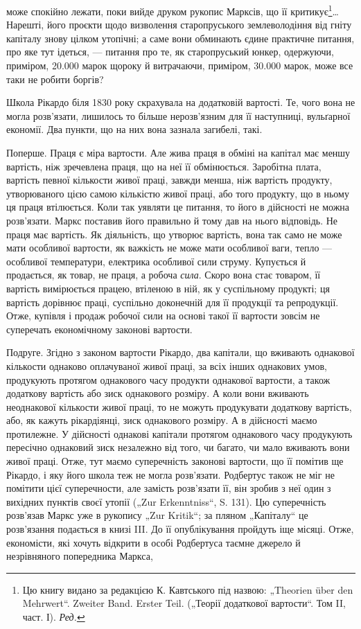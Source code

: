 \parcont{}  %
може спокійно лежати, поки вийде друком рукопис Марксів, що її критикує\footnote*{
Цю книгу видано за редакцією К. Кавтського під назвою: „Theorien über den Mehrwert“. Zweiter
Band. Erster Teil. („Теорії додаткової вартости“. Том II, част. І). \emph{Ред.}
}\dots{} Нарешті, його проєкти
щодо визволення старопруського землеволодіння від гніту капіталу знову цілком утопічні; а саме вони
обминають єдине практичне питання, про яке тут ідеться, — питання про те, як старопруський юнкер,
одержуючи, приміром, 20.000 марок щороку й витрачаючи, приміром, 30.000 марок, може все таки не
робити боргів?

Школа Рікардо біля 1830 року скрахувала на додатковій вартості. Те, чого вона не могла розв’язати,
лишилось то більше нерозв’язним для її наступниці, вульґарної економії. Два пункти, що на них вона
зазнала загибелі, такі.

Поперше. Праця є міра вартости. Але жива праця в обміні на капітал має меншу вартість, ніж
зречевлена праця, що на неї її обмінюється. Заробітна плата, вартість певної кількости живої праці,
завжди менша, ніж вартість продукту, утворюваного цією самою кількістю живої праці, або того
продукту, що в ньому ця праця втілюється. Коли
так уявляти це питання, то його в дійсності не можна розв’язати. Маркс поставив його правильно й
тому дав на нього відповідь. Не праця має вартість. Як діяльність, що утворює вартість, вона так
само не може мати особливої вартости, як важкість не може мати особливої ваги, тепло — особливої
температури, електрика особливої сили струму. Купується й продається, як товар, не праця, а робоча
\emph{сила}. Скоро вона стає товаром, її вартість вимірюється працею, втіленою в ній, як у суспільному
продукті; ця вартість дорівнює праці, суспільно доконечній для її продукції та репродукції. Отже,
купівля і продаж робочої сили на основі такої її вартости зовсім не суперечать економічному законові
вартости.

Подруге. Згідно з законом вартости Рікардо, два капітали, що вживають однакової кількости однаково
оплачуваної живої праці, за всіх інших однакових умов, продукують протягом однакового часу продукти
однакової вартости, а також додаткову вартість або зиск однакового розміру. А коли вони вживають
неоднакової кількости живої праці, то не можуть продукувати додаткову вартість, або, як кажуть
рікардіянці, зиск однакового розміру. А в дійсності маємо протилежне. У дійсності однакові
капітали протягом однакового часу продукують пересічно однаковий зиск незалежно від того, чи багато,
чи мало вживають вони живої праці. Отже, тут маємо суперечність законові вартости, що її помітив ще
Рікардо, і яку його школа теж не могла розв’язати. Родбертус також не міг не помітити цієї
суперечности, але замість розв’язати її, він зробив з неї один з вихідних пунктів своєї утопії („Zur
Erkenntniss“, S. 131). Цю суперечність розв’язав Маркс уже в рукопису „Zur Kritik“; за пляном
„Капіталу“ це розв’язання подається в книзі III. До її опублікування пройдуть іще місяці. Отже,
економісти, які хочуть відкрити в особі Родбертуса таємне джерело й незрівняного попередника Маркса,
\parbreak{}  %

